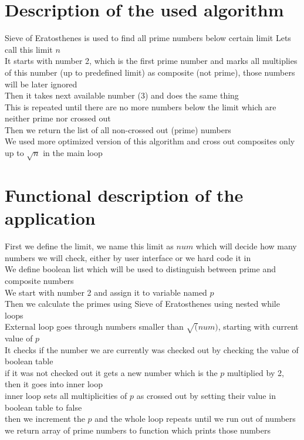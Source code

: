 \documentclass[12pt]{article}
\begin{document}
\section{Description of the used algorithm}
Sieve of Eratosthenes is used to find all prime numbers below certain limit Lets call this limit $n$ \\ 
It starts with number 2, which is the first prime number and marks all multiplies of this number (up to predefined limit) as composite (not prime), those numbers will be later ignored \\ 
Then it takes next available number (3) and does the same thing \\ 
This is repeated until there are no more numbers below the limit which are neither prime nor crossed out \\ 
Then we return the list of all non-crossed out (prime) numbers \\ 
We used more optimized version of this algorithm and cross out composites only up to $\sqrt{n}$ in the main loop \\ 
\section{Functional description of the application}
First we define the limit, we name this limit as $num$ which will decide how many numbers we will check, either by user interface or we hard code it in \\ 
We define boolean list which will be used to distinguish between prime and composite numbers \\ 
We start with number 2 and assign it to variable named $p$ \\ 
Then we calculate the primes using Sieve of Eratosthenes using nested while loops \\ 
External loop goes through numbers smaller than $\sqrt(num)$, starting with current value of $p$ \\ 
It checks if the number we are currently was checked out by checking the value of boolean table \\ 
if it was not checked out it gets a new number which is the $p$ multiplied by 2, then it goes into inner loop \\ 
inner loop sets all multiplicities of $p$ as crossed out by setting their value in boolean table to false \\ 
then we increment the $p$ and the whole loop repeats until we run out of numbers \\ 
we return array of prime numbers to function which prints those numbers 
\end{document}
